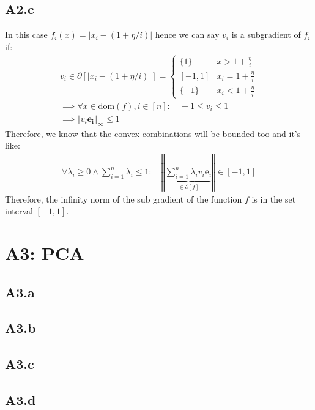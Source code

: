 \documentclass[]{article}
\begin{document}
    \subsection*{A2.c}
        In this case $f_i(x) = |x_i - (1 + \eta/i)|$ hence we can say $v_i$ is a subgradient of $f_i$ if:
        \begin{align*}\tag{A2.c.1}\label{eqn:A2.c.1}
            v_i \in \partial[|x_i - (1 + \eta/i)|] = \begin{cases}
                \{1\} & x > 1 + \frac{\eta}{i} 
                \\
                [-1, 1] & x_i = 1 + \frac{\eta}{i}
                \\
                \{-1\} & x_i < 1 + \frac{\eta}{i}
            \end{cases}
            \\
            \implies \forall x\in \text{dom}(f), i\in [n]: \quad
            -1 \le v_i \le 1
            \\
            \implies \Vert v_i\mathbf{e_i}\Vert_\infty \le 1
        \end{align*}
        Therefore, we know that the convex combinations will be bounded too and it's like: 
        \begin{align*}\tag{A2.c.2}\label{eqn:A2.c.2}
            \forall \lambda_i \ge 0 \wedge \sum_{i = 1}^{n}\lambda_i \le 1:
            \quad 
            \left\Vert 
                \underbrace{\sum_{i = 1}^{n}\lambda_iv_i\mathbf{e}_i}_{\in \partial[f]} 
            \right\Vert \in [-1, 1]
        \end{align*}
        Therefore, the infinity norm of the sub gradient of the function $f$ is in the set interval $[-1, 1]$. 
            
\section*{A3: PCA}
    \subsection*{A3.a}
    \subsection*{A3.b}
    \subsection*{A3.c}
    \subsection*{A3.d}
\end{document}
